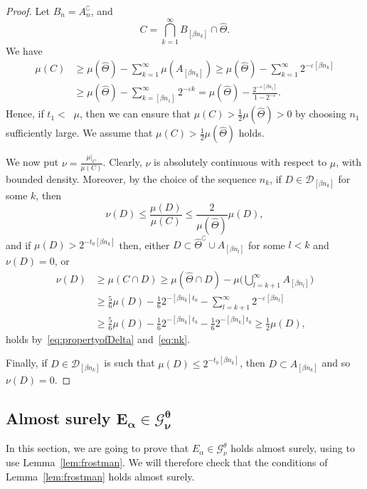 \documentclass[AHL,Unicode,longabstracts]{cedram}
\DeclareMathOperator{\udimh}{\overline{dim}_H}
\begin{document}
\begin{proof}
Let $B_n = A_n^\complement$, and
\[
C = \bigcap_{k=1}^\infty B_{[\beta n_k]} \cap \hat{\Theta}.
\]
We have
\begin{align*}
\mu (C) &\geq \mu (\hat{\Theta}) - \sum_{k=1}^\infty \mu (A_{[\beta n_k]}) \geq \mu (\hat{\Theta}) - \sum_{k=1}^\infty 2^{-
\varepsilon [\beta n_k]} \\ &\geq \mu (\hat{\Theta}) -
\sum_{k=[\beta n_1]}^\infty 2^{-\varepsilon k} = \mu (\hat{\Theta}) - \frac{2^{-\varepsilon [\beta n_1]}}{1 - 2^{-\varepsilon}}.
\end{align*}
Hence, if $t_1 < \udimh \mu$, then we can ensure that $\mu (C) >
\frac{1}{2} \mu (\hat{\Theta}) > 0$ by choosing $n_1$ sufficiently large. We assume that $\mu (C) > \frac{1}{2} \mu (\hat{\Theta})$ holds.

We now put $\nu = \frac{\mu|_C}{\mu (C)}$. Clearly, $\nu$ is absolutely continuous with respect to $\mu$, with bounded density. Moreover, by the choice of the sequence $n_k$, if $D \in
\mathscr{D}_{[\beta n_k]}$ for some $k$, then
\[
\nu (D) \leq \frac{\mu (D)}{\mu (C)} \leq \frac{2}{\mu(\hat{\Theta})}
\mu (D),
\]
and if $\mu (D) > 2^{- t_0 [\beta n_k]}$ then, either $D \subset
\hat{\Theta}^\complement \cup A_{[\beta n_l]}$ for some $l < k$ and $\nu (D) = 0$, or
\begin{align*}
\nu (D) &\geq \mu (C \cap D) \geq \mu (\hat{\Theta} \cap D) - \mu
\biggl(\bigcup_{l = k+1}^\infty A_{[\beta n_l]} \biggr) \\ &\geq
\frac{5}{6} \mu (D) - \frac{1}{6} 2^{-[\beta n_k]t_0} -
\sum_{l=k+1}^\infty 2^{-\varepsilon [\beta n_l]} \\ &\geq
\frac{5}{6} \mu (D) - \frac{1}{6} 2^{-[\beta n_k]t_0} -
\frac{1}{6} 2^{-[\beta n_k] t_0} \geq \frac{1}{2} \mu (D),
\end{align*}
holds by~\eqref{eq:propertyofDelta} and~\eqref{eq:nk}.

Finally, if $D \in \mathscr{D}_{[\beta n_k]}$ is such that $\mu (D)
\leq 2^{- t_0 [\beta n_k]}$, then $D \subset A_{[\beta n_k]}$ and so $\nu (D) = 0$.
\end{proof}

\subsection{Almost surely \texorpdfstring{$\boldsymbol{E_\alpha \in \mathscr{G}_\nu^\theta}$}{}}

In this section, we are going to prove that $E_\alpha \in
\mathscr{G}_\nu^\theta$ holds almost surely, using to use Lemma~\ref{lem:frostman}. We will therefore check that the conditions of Lemma~\ref{lem:frostman} holds almost surely.
\end{document}
